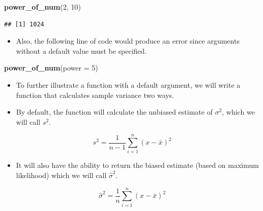 \documentclass[]{book}
\newenvironment{Shaded}{\begin{snugshade}}{\end{snugshade}}
\newcommand{\KeywordTok}[1]{\textcolor[rgb]{0.13,0.29,0.53}{\textbf{#1}}}
\newcommand{\DataTypeTok}[1]{\textcolor[rgb]{0.13,0.29,0.53}{#1}}
\newcommand{\DecValTok}[1]{\textcolor[rgb]{0.00,0.00,0.81}{#1}}
\newcommand{\NormalTok}[1]{#1}
\providecommand{\tightlist}{%
  \setlength{\itemsep}{0pt}\setlength{\parskip}{0pt}}
\begin{document}
\begin{Shaded}
\begin{Highlighting}[]
\KeywordTok{power_of_num}\NormalTok{(}\DecValTok{2}\NormalTok{, }\DecValTok{10}\NormalTok{)}
\end{Highlighting}
\end{Shaded}

\begin{verbatim}
## [1] 1024
\end{verbatim}

\begin{itemize}
\tightlist
\item
  Also, the following line of code would produce an error since
  arguments without a default value must be specified.
\end{itemize}

\begin{Shaded}
\begin{Highlighting}[]
\KeywordTok{power_of_num}\NormalTok{(}\DataTypeTok{power =} \DecValTok{5}\NormalTok{)}
\end{Highlighting}
\end{Shaded}

\begin{itemize}
\item
  To further illustrate a function with a default argument, we will
  write a function that calculates sample variance two ways.
\item
  By default, the function will calculate the unbiased estimate of
  \(\sigma^2\), which we will call \(s^2\).
\end{itemize}

\[
s^2 = \frac{1}{n - 1}\sum_{i=1}^{n}(x - \bar{x})^2
\]

\begin{itemize}
\tightlist
\item
  It will also have the ability to return the biased estimate (based on
  maximum likelihood) which we will call \(\hat{\sigma}^2\).
\end{itemize}

\[
\hat{\sigma}^2 = \frac{1}{n}\sum_{i=1}^{n}(x - \bar{x})^2
\]
\end{document}
